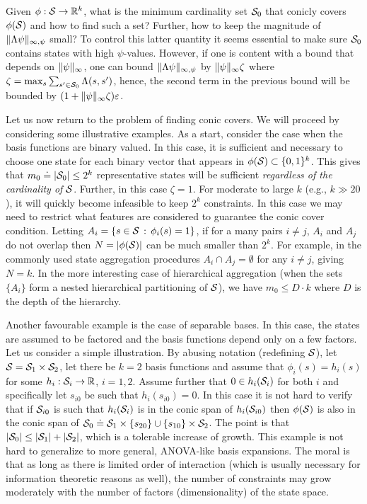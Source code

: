 \documentclass[twocolumn]{IEEEtran}
\begin{document}
Given $\phi:\S \to \Re^k$, what is the minimum cardinality set $\S_0$ that 
conicly covers $\phi(\S)$ and how to find such a set? Further, how to keep the magnitude of $\norm{\Lambda \psi}_{\infty,\psi}$ small? To control this latter quantity it seems essential to make sure $\S_0$ contains states with high $\psi$-values. 
However, if one is content with a bound that depends on $\norm{\psi}_{\infty}$, one can bound 
$\norm{\Lambda \psi}_{\infty,\psi}$ by $\norm{\psi}_{\infty} \zeta$ where $\zeta = \max_s \sum_{s'\in \S_0} \Lambda(s,s')$,
hence, the second term in the previous bound will be bounded by $(1+\norm{\psi}_{\infty} \zeta) \eps$.

Let us now return to the problem of finding conic covers. 
We will proceed by considering some illustrative examples. 
As a start, consider the case when the basis functions are binary valued.
In this case, it is sufficient and necessary to choose one state for each binary vector 
that appears in $\phi(\S)\subset \{0,1\}^k$.
This gives that $m_0 \doteq |\S_0|\le 2^k$ representative states will be sufficient \emph{regardless of the cardinality of $\S$}.
Further, in this case $\zeta = 1$.
For moderate to large $k$ (e.g., $k\gg 20$), it will quickly become infeasible to keep $2^k$ constraints.
In this case we may need to restrict what features are considered to guarantee the conic cover condition.
Letting $A_i = \{s\in \S\,:\, \phi_i(s)=1 \}$, if for a many pairs $i\ne j$, $A_i$ and $A_j$ do not overlap 
then $N = |\phi(\S)|$ can be much smaller than $2^k$. 
For example, in the commonly used state aggregation procedures 
$A_i \cap A_j = \emptyset$ for any $i\ne j$, giving $N=k$. 
In the more interesting case of 
hierarchical aggregation (when the sets $\{A_i\}$ form a nested hierarchical partitioning of $\S$), 
we have $m_0 \le D \cdot k$ where $D$ is the depth of the hierarchy.

Another favourable example is the case of separable bases.
In this case, the states are assumed to be factored 
and the basis functions depend only on a few factors.
Let us consider a simple illustration.
By abusing notation (redefining $\S$), let $\S = \S_1 \times \S_2$, 
let there be $k=2$ basis functions and assume that $\phi_i(s) = h_i(s)$ for some $h_i:\S_i \to \Re$, $i=1,2$.
Assume further that $0\in h_i(\S_i)$ for both $i$ and specifically let $s_{i0}$ be such that $h_i(s_{i0})=0$.
In this case it is not hard to verify that if $\S_{i0}$ is such that $h_i(\S_i)$ is in the conic span of $h_i(\S_{i0})$ then
$\phi(\S)$ is also in the conic span of $\S_0 \doteq \S_1 \times \{ s_{20} \} \cup \{ s_{10} \} \times \S_2$.
The point is that $|\S_0| \le |\S_1| + |\S_2|$, which is a tolerable increase of growth.
This example is not hard to generalize to more general, ANOVA-like basis expansions. The moral
is that as long as there is limited order of interaction (which is usually necessary for information theoretic reasons as well),
the number of constraints may grow moderately with the number of factors (dimensionality) of the state space.
\end{document}
